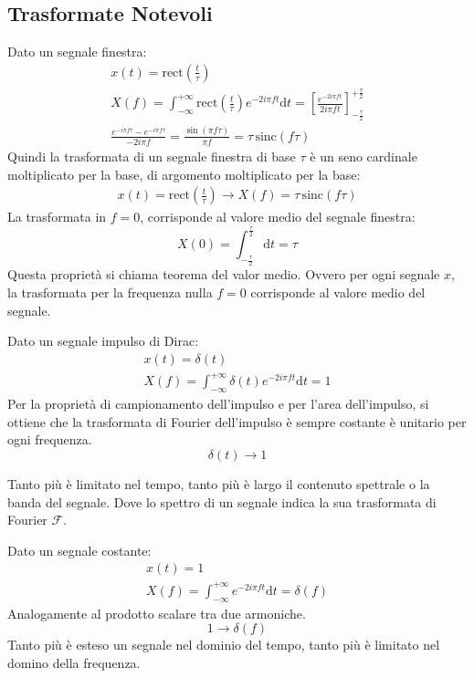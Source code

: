 \documentclass{article}
\newcommand{\rect}{\mathrm{rect}}
\newcommand{\sinc}{\mathrm{sinc}}
\newcommand{\df}{\mathrm{d}}
\numberwithin{equation}{subsection}
\begin{document}
\subsection{Trasformate Notevoli}

Dato un segnale finestra:
\begin{gather*}
    x(t)=\rect\displaystyle\left(\frac{t}{\tau}\right)\\
    X(f)=\displaystyle\int_{-\infty}^{+\infty}\rect\left(\frac{t}{\tau}\right)e^{-2i\pi ft}\df t=\left[\frac{e^{-2i\pi ft}}{2i\pi ft}\right]^{+\frac{\tau}{2}}_{-\frac{\tau}{2}}\\
    \displaystyle\frac{e^{-i\pi f\tau}-e^{-i\pi f\tau}}{-2i\pi f}=\frac{\sin(\pi f\tau)}{\pi f}=\tau\,\sinc(f\tau)
\end{gather*}
Quindi la trasformata di un segnale finestra di base $\tau$ è un seno cardinale moltiplicato per la base, di argomento moltiplicato per la base:
\begin{gather}
    x(t)=\rect\displaystyle\left(\frac{t}{\tau}\right)\rightarrow X(f)=\tau\,\sinc(f\tau)
\end{gather}
La trasformata in $f=0$, corrisponde al valore medio del segnale finestra:
\begin{equation*}
    X(0)=\displaystyle\int_{-\frac{\tau}{2}}^{\frac{\tau}{2}}\df t=\tau
\end{equation*}
Questa proprietà si chiama teorema del valor medio. Ovvero per ogni segnale $x$, la trasformata per la frequenza nulla $f=0$ corrisponde al valore medio del segnale. 



Dato un segnale impulso di Dirac:
\begin{gather*}
    x(t)=\delta(t)\\
    X(f)=\displaystyle\int_{-\infty}^{+\infty}\delta(t)e^{-2i\pi ft}\df t=1
\end{gather*}
Per la proprietà di campionamento dell'impulso e per l'area dell'impulso, si ottiene che la trasformata di Fourier dell'impulso è sempre costante è unitario per ogni frequenza. 
\begin{equation}
    \delta(t)\to1
\end{equation}

Tanto più è limitato nel tempo, tanto più è largo il contenuto spettrale o la banda del segnale. Dove lo spettro di un segnale indica la sua trasformata di Fourier 
$\mathscr{F}$. 


Dato un segnale costante:
\begin{gather*}
    x(t)=1\\
    X(f)=\displaystyle\int_{-\infty}^{+\infty}e^{-2i\pi ft}\df t=\delta (f)
\end{gather*}
Analogamente al prodotto scalare tra due armoniche. 
\begin{equation}
    1\to\delta(f)
\end{equation}
Tanto più è esteso un segnale nel dominio del tempo, tanto più è limitato nel domino della frequenza. 
\end{document}
